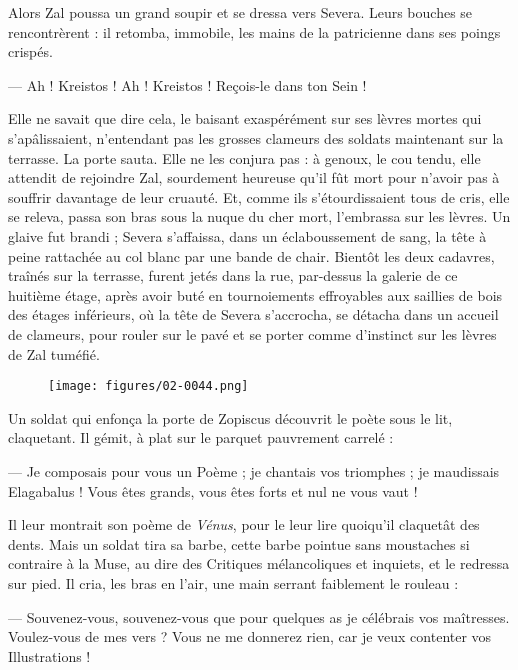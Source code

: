 \documentclass[a4paper, 11pt, oneside, polutonikogreek, french]{article}
\begin{document}
Alors Zal poussa un grand soupir et se dressa vers Severa. Leurs bouches se rencontrèrent : il retomba, immobile, les mains de la patricienne dans ses poings crispés.

--- Ah ! Kreistos ! Ah ! Kreistos ! Reçois-le dans ton Sein !

Elle ne savait que dire cela, le baisant exaspérément sur ses lèvres mortes qui s'apâlissaient, n'entendant pas les grosses clameurs des soldats maintenant sur la terrasse. La porte sauta. Elle ne les conjura pas : à genoux, le cou tendu, elle attendit de rejoindre Zal, sourdement heureuse qu'il fût mort pour n'avoir pas à souffrir davantage de leur cruauté. Et, comme ils s'étourdissaient tous de cris, elle se releva, passa son bras sous la nuque du cher mort, l'embrassa sur les lèvres. Un glaive fut brandi ; Severa s'affaissa, dans un éclaboussement de sang, la tête à peine rattachée au col blanc par une bande de chair. Bientôt les deux cadavres, traînés sur la terrasse, furent jetés dans la rue, par-dessus la galerie de ce huitième étage, après avoir buté en tournoiements effroyables aux saillies de bois des étages inférieurs, où la tête de Severa s'accrocha, se détacha dans un accueil de clameurs, pour rouler sur le pavé et se porter comme d'instinct sur les lèvres de Zal tuméfié.
\begin{figure}[H]
\centering
\texttt{[image: figures/02-0044.png]}
\end{figure}
Un soldat qui enfonça la porte de Zopiscus découvrit le poète sous le lit, claquetant. Il gémit, à plat sur le parquet pauvrement carrelé :

--- Je composais pour vous un Poème ; je chantais vos triomphes ; je maudissais Elagabalus ! Vous êtes grands, vous êtes forts et nul ne vous vaut !

Il leur montrait son poème de \emph{Vénus}, pour le leur lire quoiqu'il claquetât des dents. Mais un soldat tira sa barbe, cette barbe pointue sans moustaches si contraire à la Muse, au dire des Critiques mélancoliques et inquiets, et le redressa sur pied. Il cria, les bras en l'air, une main serrant faiblement le rouleau :

--- Souvenez-vous, souvenez-vous que pour quelques as je célébrais vos maîtresses. Voulez-vous de mes vers ? Vous ne me donnerez rien, car je veux contenter vos Illustrations !
\end{document}

